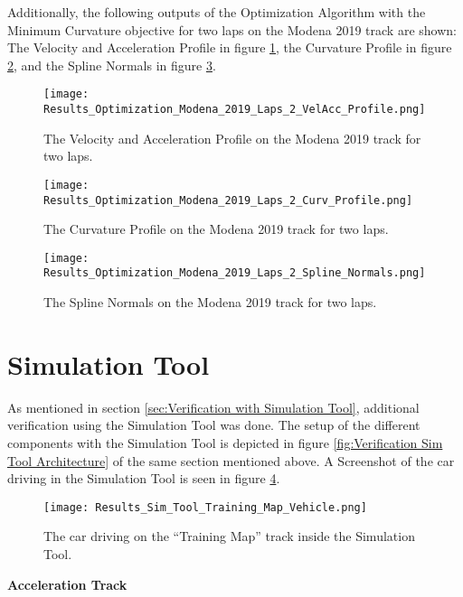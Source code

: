 Additionally, the following outputs of the Optimization Algorithm with the Minimum Curvature objective for two laps on the Modena 2019 track are shown: The Velocity and Acceleration Profile in figure \ref{fig:Results Modena 2019 Laps 2 VelAcc Profile}, the Curvature Profile in figure \ref{fig:Results Modena 2019 Laps 2 Curv Profile}, and the Spline Normals in figure \ref{fig:Results Modena 2019 Laps 2 Spline Normals}.
\begin{figure}[H]
    \centering
    \texttt{[image: Results\_Optimization\_Modena\_2019\_Laps\_2\_VelAcc\_Profile.png]}
    \caption{The Velocity and Acceleration Profile on the Modena 2019 track for two laps.}
    \label{fig:Results Modena 2019 Laps 2 VelAcc Profile}
\end{figure}
\begin{figure}[H]
    \centering
    \texttt{[image: Results\_Optimization\_Modena\_2019\_Laps\_2\_Curv\_Profile.png]}
    \caption{The Curvature Profile on the Modena 2019 track for two laps.}
    \label{fig:Results Modena 2019 Laps 2 Curv Profile}
\end{figure}
\begin{figure}[H]
    \centering
    \texttt{[image: Results\_Optimization\_Modena\_2019\_Laps\_2\_Spline\_Normals.png]}
    \caption{The Spline Normals on the Modena 2019 track for two laps.}
    \label{fig:Results Modena 2019 Laps 2 Spline Normals}
\end{figure}

\pagebreak

\section{Simulation Tool}
As mentioned in section \ref{sec:Verification with Simulation Tool}, additional verification using the Simulation Tool was done. The setup of the different components with the Simulation Tool is depicted in figure \ref{fig:Verification Sim Tool Architecture} of the same section mentioned above. A Screenshot of the car driving in the Simulation Tool is seen in figure \ref{fig:Results Sim Tool Training Map Vehicle}.
\begin{figure}[H]
    \centering
    \texttt{[image: Results\_Sim\_Tool\_Training\_Map\_Vehicle.png]}
    \caption{The car driving on the ``Training Map'' track inside the Simulation Tool.}
    \label{fig:Results Sim Tool Training Map Vehicle}
\end{figure}

\textbf{Acceleration Track}

